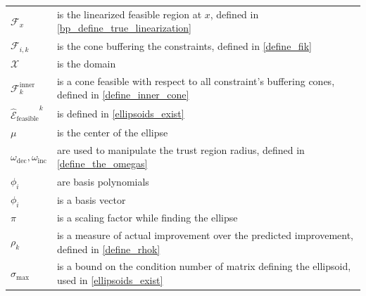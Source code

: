 \documentclass{article}
\theoremstyle{case}
\newcommand{\domain}{{\mathcal X}}
\newcommand{\fcki}{{\mathcal {F}^{\text{inner}}_k}}
\newcommand{\fik}{{\mathcal F_{i, k}}}
\newcommand{\omegadec}{\omega_{\text{dec}}}
\newcommand{\omegainc}{\omega_{\text{inc}}}
\newcommand{\rk}{\rho_k}
\newcommand{\scaledunshiftedellipsoid}{{{\mathcal {\hat E}_{\text{feasible}}}^k}}
\newcommand{\sigmamax}{{\sigma_{\text{max}}}}
\begin{document}
\begin{longtable}{| p{} | p{} |}
$\mathcal F_x$ & is the linearized feasible region at $x$, defined in \cref{bp_define_true_linearization} \\ %
$\fik $ & is the cone buffering the constraints, defined in \cref{define_fik} \\ %
$\domain$ & is the domain \\ %
$\fcki $ & is a cone feasible with respect to all constraint's buffering cones, defined in \cref{define_inner_cone} \\ %
$\scaledunshiftedellipsoid$ & is defined in \cref{ellipsoids_exist} \\ %
$\mu$ & is the center of the ellipse \\ %
$\omegadec, \omegainc$ & are used to manipulate the trust region radius, defined in \cref{define_the_omegas} \\ %
$\phi_i$ & are basis polynomials \\ %
$\phi_i$ & is a basis vector \\ %
$\pi$ & is a scaling factor while finding the ellipse \\ %
$\rk$ & is a measure of actual improvement over the predicted improvement, defined in \cref{define_rhok} \\ %
$\sigmamax$ & is a bound on the condition number of matrix defining the ellipsoid, used in \cref{ellipsoids_exist} \\ %

\end{longtable}
\end{document}
